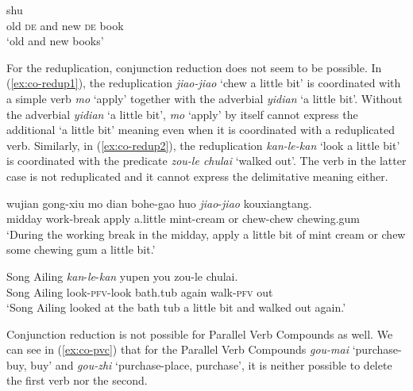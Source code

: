   \ex {} shu\\
  old \textsc{de} and new \textsc{de} book\\ 
  \glt `old and new books'
   \z
\z

\ea\label{ex:co-word}
  
  \z
\z

For the reduplication, conjunction reduction does not seem to be possible. 
In (\ref{ex:co-redup1}), the reduplication \textit{jiao-jiao} `chew a little bit' is coordinated with a simple verb \textit{mo} `apply' together with the adverbial \textit{yidian} `a little bit'.
Without the adverbial \textit{yidian} `a little bit', \textit{mo} `apply' by itself cannot express the additional `a little bit' meaning even when it is coordinated with a reduplicated verb.
Similarly, in (\ref{ex:co-redup2}), the reduplication \textit{kan-le-kan} `look a little bit' is coordinated with the predicate \textit{zou-le chulai} `walked out'. The verb in the latter case is not reduplicated and it cannot express the delimitative meaning either.

\settowidth{}

\ea
  \ea\label{ex:co-redup1}
  \gll wujian gong-xiu mo dian bohe-gao huo \textit{jiao}-\textit{jiao} kouxiangtang.\\
    midday work-break apply a.little mint-cream or chew-chew chewing.gum\\ 
    \glt `During the working break in the midday, apply a little bit of mint cream or chew some chewing gum a little bit.'
    
   \ex\label{ex:co-redup2}
   \gll Song Ailing \textit{kan}-\textit{le}-\textit{kan} yupen you zou-le chulai.\\
   Song Ailing look-\textsc{pfv}-look bath.tub again walk-\textsc{pfv} out\\  
   \glt `Song Ailing looked at the bath tub a little bit and walked out again.'
   \z
\z

Conjunction reduction is not possible for Parallel Verb Compounds as well.
We can see in (\ref{ex:co-pvc}) that for the Parallel Verb Compounds \textit{gou-mai} `purchase-buy, buy' and \textit{gou\hyp{}zhi} `purchase\hyp{}place, purchase', it is neither possible to delete the first verb nor the second.


